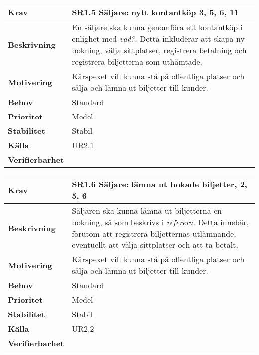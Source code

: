 \documentclass[a4paper, twoside, 11pt, titlepage]{article}
\begin{document}
	\begin{tabular} { p{2.6cm} p{12.5cm} }
		\hline
		\sffamily\textbf{Krav} & \sffamily\textbf{SR1.5 Säljare: nytt kontantköp 3, 5, 6, 11 } \\
		\hline
		\sffamily\textbf{Beskrivning} & En säljare ska kunna genomföra ett kontantköp i enlighet med \emph{vad?}. Detta inkluderar att skapa ny bokning, välja sittplatser, registrera betalning och registrera biljetterna som uthämtade.  \\
		\hline
		\sffamily\textbf{Motivering} & Kårspexet vill kunna stå på offentliga platser och sälja och lämna ut biljetter till kunder.  \\
		\hline
		\sffamily\textbf{Behov} & Standard  \\
		\hline
		\sffamily\textbf{Prioritet} & Medel  \\
		\hline
		\sffamily\textbf{Stabilitet} & Stabil  \\
		\hline
		\sffamily\textbf{Källa} & UR2.1  \\
		\hline
		\sffamily\textbf{Verifierbarhet} &   \\
		\hline
	\end{tabular}
	\vspace{6mm}

	\begin{tabular} { p{2.6cm} p{12.5cm} }
		\hline
		\sffamily\textbf{Krav} & \sffamily\textbf{SR1.6 Säljare: lämna ut bokade biljetter, 2, 5, 6 } \\
		\hline
		\sffamily\textbf{Beskrivning} & Säljaren ska kunna lämna ut biljetterna en bokning, så som beskrivs i \emph{referera}. Detta innebär, förutom att registrera biljetternas utlämnande, eventuellt att välja sittplatser och att ta betalt.  \\
		\hline
		\sffamily\textbf{Motivering} & Kårspexet vill kunna stå på offentliga platser och sälja och lämna ut biljetter till kunder.  \\
		\hline
		\sffamily\textbf{Behov} & Standard  \\
		\hline
		\sffamily\textbf{Prioritet} & Medel  \\
		\hline
		\sffamily\textbf{Stabilitet} & Stabil  \\
		\hline
		\sffamily\textbf{Källa} & UR2.2  \\
		\hline
		\sffamily\textbf{Verifierbarhet} &   \\
		\hline
	\end{tabular}
	\vspace{6mm}
\end{document}
